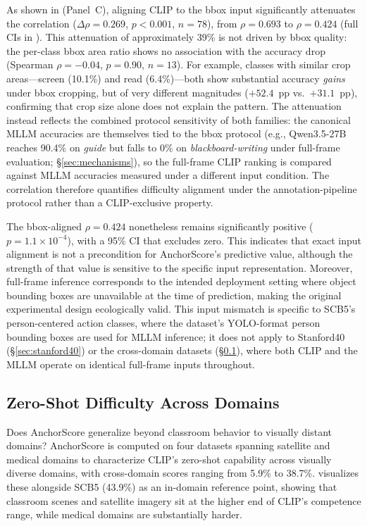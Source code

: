 \documentclass[a4paper,fleqn]{cas-sc}
\begin{document}
As shown in  (Panel~C), aligning CLIP to the bbox input significantly attenuates the correlation ($\Delta\rho=0.269$, $p<0.001$, $n=78$), from $\rho=0.693$ to $\rho=0.424$ (full CIs in ). This attenuation of approximately 39\% is not driven by bbox quality: the per-class bbox area ratio shows no association with the accuracy drop (Spearman $\rho=-0.04$, $p=0.90$, $n=13$). For example, classes with similar crop areas---screen (10.1\%) and read (6.4\%)---both show substantial accuracy \emph{gains} under bbox cropping, but of very different magnitudes ($+52.4$~pp vs.\ $+31.1$~pp), confirming that crop size alone does not explain the pattern. The attenuation instead reflects the combined protocol sensitivity of both families: the canonical MLLM accuracies are themselves tied to the bbox protocol (e.g., Qwen3.5-27B reaches 90.4\% on \textit{guide} but falls to 0\% on \textit{blackboard-writing} under full-frame evaluation; \S\ref{sec:mechanisms}), so the full-frame CLIP ranking is compared against MLLM accuracies measured under a different input condition. The correlation therefore quantifies difficulty alignment under the annotation-pipeline protocol rather than a CLIP-exclusive property.

The bbox-aligned $\rho=0.424$ nonetheless remains significantly positive ($p=1.1\times10^{-4}$), with a 95\% CI that excludes zero. This indicates that exact input alignment is not a precondition for AnchorScore's predictive value, although the strength of that value is sensitive to the specific input representation. Moreover, full-frame inference corresponds to the intended deployment setting where object bounding boxes are unavailable at the time of prediction, making the original experimental design ecologically valid. This input mismatch is specific to SCB5's person-centered action classes, where the dataset's YOLO-format person bounding boxes are used for MLLM inference; it does not apply to Stanford40 (\S\ref{sec:stanford40}) or the cross-domain datasets (\S\ref{sec:cross_domain}), where both CLIP and the MLLM operate on identical full-frame inputs throughout.

\subsection{Zero-Shot Difficulty Across Domains}
\label{sec:cross_domain}

Does AnchorScore generalize beyond classroom behavior to visually distant domains? AnchorScore is computed on four datasets spanning satellite and medical domains to characterize CLIP's zero-shot capability across visually diverse domains, with cross-domain scores ranging from 5.9\% to 38.7\%.  visualizes these alongside SCB5 (43.9\%) as an in-domain reference point, showing that classroom scenes and satellite imagery sit at the higher end of CLIP's competence range, while medical domains are substantially harder.
\end{document}
